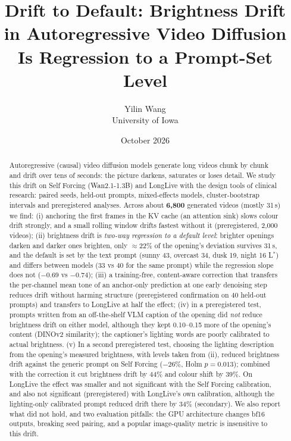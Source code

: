 \documentclass[11pt]{article}
\title{Drift to Default: Brightness Drift in Autoregressive Video Diffusion\\ Is Regression to a Prompt-Set Level}
\author{Yilin Wang\\ University of Iowa}
\date{October 2026}
\newcommand{\Lstar}{L$^{*}$}
\begin{document}
\maketitle

\begin{abstract}
Autoregressive (causal) video diffusion models generate long videos chunk by chunk and drift over tens of seconds:
the picture darkens, saturates or loses detail. We study this drift on Self Forcing (Wan2.1-1.3B) and LongLive with
the design tools of clinical research: paired seeds, held-out prompts, mixed-effects models, cluster-bootstrap
intervals and preregistered analyses. Across about \textbf{6{,}800} generated videos (mostly 31\,s) we find:
(i) anchoring the first frames in the KV cache (an attention sink) slows colour drift strongly, and a small rolling
window drifts fastest without it (preregistered, 2{,}000 videos);
(ii) brightness drift is \emph{two-way regression to a default level}: brighter openings darken and darker ones
brighten, only $\approx$22\% of the opening's deviation survives 31\,s, and the default is set by the text prompt
(sunny 43, overcast 34, dusk 19, night 16 \Lstar) and differs between models (33 vs 40 for the same prompt) while the
regression slope does not ($-0.69$ vs $-0.74$);
(iii) a training-free, content-aware correction that transfers the per-channel mean tone of an anchor-only prediction
at one early denoising step reduces drift without harming structure (preregistered confirmation on 40 held-out prompts)
and transfers to LongLive at half the effect;
(iv) in a preregistered test, prompts written from an off-the-shelf VLM caption of the opening did \emph{not} reduce brightness drift on either model, although they kept 0.10--0.15 more of the opening's content (DINOv2 similarity); the captioner's lighting words are poorly calibrated to actual brightness. (v) In a second preregistered test, choosing the lighting description from the opening's measured brightness, with levels taken from (ii), reduced brightness drift against the generic prompt on Self Forcing ($-26\%$, Holm $p=0.013$); combined with the correction it cut brightness drift by 44\% and colour shift by 39\%. On LongLive the effect was smaller and not significant with the Self Forcing calibration, and also not significant (preregistered) with LongLive's own calibration, although the lighting-only calibrated prompt reduced drift there by 34\% (secondary).
We also report what did not hold, and two evaluation pitfalls: the GPU architecture changes bf16 outputs, breaking
seed pairing, and a popular image-quality metric is insensitive to this drift.
\end{abstract}
\end{document}

